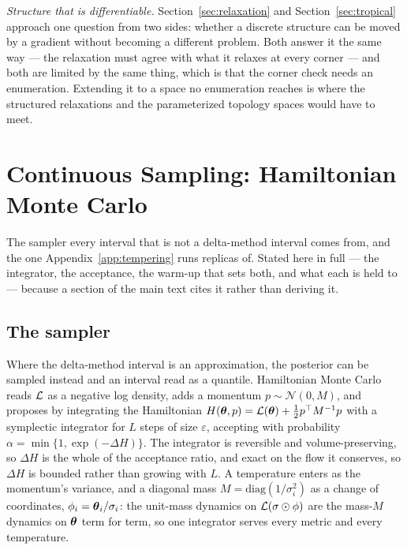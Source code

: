 \documentclass[11pt,a4paper]{article}
\begin{document}
\emph{Structure that is differentiable.} Section~\ref{sec:relaxation} and
Section~\ref{sec:tropical} approach one question from two sides: whether a
discrete structure can be moved by a gradient without becoming a different
problem. Both answer it the same way --- the relaxation must agree with what
it relaxes at every corner --- and both are limited by the same thing, which
is that the corner check needs an enumeration. Extending it to a space no
enumeration reaches is where the structured relaxations \citep{paulus2020} and
the parameterized topology spaces \citep{zhang2019} would have to meet.




\appendix

\section{Continuous Sampling: Hamiltonian Monte Carlo}
\label{app:hmc}
\label{sec:hmc}

The sampler every interval that is not a delta-method interval comes from, and
the one Appendix~\ref{app:tempering} runs replicas of. Stated here in full ---
the integrator, the acceptance, the warm-up that sets both, and what each is
held to --- because a section of the main text cites it rather than deriving
it.

\subsection{The sampler}
Where the delta-method interval is an approximation, the posterior can be
sampled instead and an interval read as a quantile. Hamiltonian Monte Carlo
\citep{neal2011} reads $\mathcal{L}$ as a negative log density, adds a momentum
$p \sim \mathcal{N}(0, M)$, and proposes by integrating the Hamiltonian
$H(\boldsymbol{\theta}, p) = \mathcal{L}(\boldsymbol{\theta}) + \tfrac{1}{2} p^{\top} M^{-1} p$ with a
symplectic integrator for $L$ steps of size $\varepsilon$, accepting with
probability $\alpha = \min\{1, \exp(-\Delta H)\}$. The integrator is reversible
and volume-preserving, so $\Delta H$ is the whole of the acceptance ratio, and
exact on the flow it conserves, so $\Delta H$ is bounded rather than growing
with $L$. A temperature enters as the momentum's variance, and a diagonal mass
$M = \mathrm{diag}(1/\sigma_i^2)$ as a change of coordinates,
$\phi_i = \boldsymbol{\theta}_i / \sigma_i$: the unit-mass dynamics on
$\mathcal{L}(\sigma \odot \phi)$ are the mass-$M$ dynamics on $\boldsymbol{\theta}$ term for
term, so one integrator serves every metric and every temperature.
\end{document}

